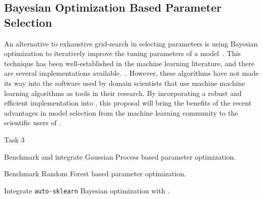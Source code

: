 \subsection{Bayesian Optimization Based Parameter Selection}
An alternative to exhaustive grid-search in selecting parameters is using
Bayesian optimization to iteratively improve the tuning parameters of a
model~\autocite{NIPS2011_4443, shahriari2016taking, NIPS2012_4522}.  This
technique has been well-established in the machine learning literature, and
there are several implementations available.~\autocite{bergstra2013hyperopt,
feurer-nips2015, komer2014hyperopt, snoek2015scalable}.  However, these
algorithms have not made its way into the software used by domain scientists
that use machine machine learning algorithms as tools in their research.
By incorporating a robust and efficient implementation into \sklearn{},
this proposal will bring the benefits of the recent advantages in model selection
from the machine learning community to the scientific users of \sklearn{}.
\begin{labeling}{Task 3}
    \item [Task 3] Benchmark and integrate Gaussian Process based parameter optimization.
    \item [Task 4] Benchmark Random Forest based parameter optimization.
    \item [Task 5] Integrate \texttt{auto-sklearn} Bayesian optimization with \sklearn{}.
\end{labeling}


